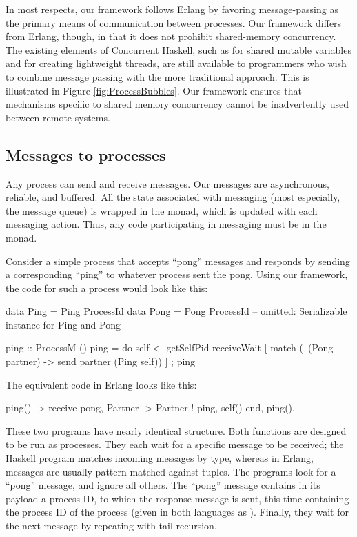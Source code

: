 \documentclass[preprint]{sigplanconf}
\begin{document}
In most respects, our framework follows Erlang by favoring message-passing as the primary means of communication between processes. Our framework differs from Erlang, though, in that it does not prohibit shared-memory concurrency. The existing elements of Concurrent Haskell, such as  for shared mutable variables and  for creating lightweight threads, are still available to programmers who wish to combine message passing with the more traditional approach. This is illustrated in Figure \ref{fig:ProcessBubbles}. Our framework ensures that mechanisms specific to shared memory concurrency cannot be inadvertently used between remote systems. 

\subsection{Messages to processes}

Any process can send and receive messages. Our messages are asynchronous, reliable, and buffered.  All the state associated with messaging (most especially, the message queue) is wrapped in the  monad, which is updated with each messaging action. Thus, any code participating in messaging must be in the  monad.

Consider a simple process that accepts ``pong'' messages and responds by sending a corresponding ``ping'' to whatever process sent the pong. Using our framework, the code for such a process would look like this:

\begin{code}[caption={Ping in Haskell}]
data Ping = Ping ProcessId
data Pong = Pong ProcessId
-- omitted: Serializable instance for Ping and Pong

ping :: ProcessM ()
ping = 
   do { self <- getSelfPid
        receiveWait [
          match (\ (Pong partner) -> 
            send partner (Ping self)) ]
      ; ping }
\end{code}

The equivalent code in Erlang looks like this:

\begin{code}[language=Erlang,caption={Ping in Erlang}]
ping() ->
  receive
    {pong, Partner} -> 
      Partner ! {ping, self()}
  end,
  ping().               
\end{code}

These two programs have nearly identical structure. Both  functions are designed to be run as processes. They each wait for a specific message to be received; the Haskell program matches incoming messages by type, whereas in Erlang, messages are usually pattern-matched against tuples. The programs look for a ``pong'' message, and ignore all others. The ``pong'' message contains in its payload a process ID, to which the response message is sent, this time containing the process ID of the  process (given in both languages as ). Finally, they wait for the next message by repeating with tail recursion.
\end{document}
